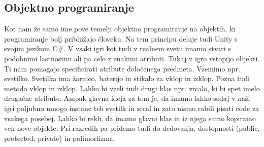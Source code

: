 {\color{indiagreen}\subsection{Objektno programiranje}}
Kot nam že samo ime pove temelji objektno programiranje na objektih, ki programiranje bolj pribljižajo človeku. Na tem principu deluje tudi Unity s svojim jezikom C\#. V vsaki igri kot tudi v realnem svetu imamo stvari s podobnimi lastnostmi ali pa celo z enakimi atributi. Tukaj v igro vstopijo objekti. Ti nam pomagajo specificirati atribute določenega predmeta. Vzemimo npr. svetilko. Svetilka ima žarnico, baterijo in stikalo za vklop in izklop. Pozna tudi metodo vklop in izklop. Lahko bi vzeli tudi drugi klas npr. zrcalo, ki bi spet imelo drugačne atribute. Ampak glavna ideja za tem je, da imamo lahko sedaj v naši igri poljubno mnogo instanc teh svetilk in zrcal in zato nismo rabili pisati code za vsakega posebej. Lahko bi rekli, da imamo glavni klas in iz njega samo kopiramo ven nove objekte. Pri razredih pa pridemo tudi do dedovanja, dostopnosti (public, protected, private) in polimorfizma.